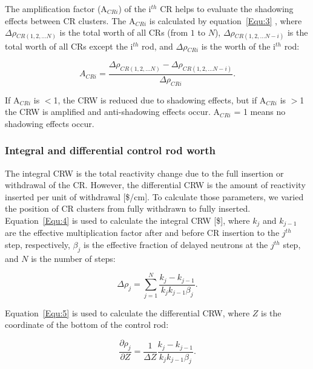 The amplification factor (A$_{CRi}$) of the i$^{th}$ CR helps to evaluate the shadowing effects between CR clusters. The A$_{CRi}$ is calculated by equation~\ref{Equ:3} \cite{girardin2007control,vcerba2017optimization}, where $\Delta\rho$$_{CR(1,2,\ldots N)}$ is the total worth of all CRs (from $1$ to $N$), $\Delta\rho$$_{CR(1,2,\ldots N-i)}$ is the total worth of all CRs except the i$^{th}$ rod, and $\Delta\rho$$_{CRi}$ is the worth of the i$^{th}$ rod:

\begin{equation}
\label{Equ:3}
{{A}_{CRi}}=\dfrac{{{\Delta}{\rho}_{CR(1,2,\ldots N)}}-{{\Delta}{\rho}_{CR(1,2,\ldots N-i)}}}{{\Delta}{\rho}_{CRi}}.
\end{equation}

If A$_{CRi}$ is $<$1, the CRW is reduced due to shadowing effects, but if A$_{CRi}$ is $>$1 the CRW is amplified and anti-shadowing effects occur. A$_{CRi}$ = 1 means no shadowing effects occur.

\subsubsection{Integral and differential control rod worth}

The integral CRW is the total reactivity change due to the full 
insertion or withdrawal of the CR. However, the differential CRW is the amount of 
reactivity inserted per unit of withdrawal [\$/cm]. To calculate those 
parameters, we varied the position of CR clusters from fully withdrawn to 
fully inserted. Equation~\ref{Equ:4} is used to calculate the integral CRW 
[\$], where $k_{j}$ and $k_{j-1}$ are the effective multiplication factor 
after and before CR insertion to the $j$$^{th}$ step, respectively, $\beta_{j}$ is the effective 
fraction of delayed neutrons at the $j$$^{th}$ step, and $N$ is the number of steps:

\begin{equation}
\label{Equ:4}
{{\Delta}{\rho}_{j}}=\sum_{j=1}^{N}\dfrac{{k_{j}}-{k_{j-1}}}{{{k_{j}}{k_{j-1}}}{{\beta}_{j}}}.
\end{equation}

Equation~\ref{Equ:5} is used to calculate the differential CRW, where 
$Z$ is the coordinate of the bottom of the control rod:

\begin{equation}
\label{Equ:5}
\dfrac{{\partial}{\rho}_{j}}{{\partial{Z}}}=\dfrac{1}{{\Delta}{Z}}\dfrac{{k_{j}}-{k_{j-1}}}{{{k_{j}}{k_{j-1}}}{{\beta}_{j}}}.
\end{equation}


